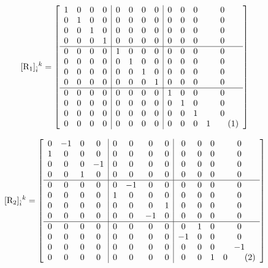 \documentclass[12pt]{article}
\newcommand\numberthis{\addtocounter{equation}{1}\tag{\theequation}}
\begin{document}
\[
[{\rm R_1}]_{\hat i}{}^{k} = \left[\begin{array}{cccc|cccc|cccc}
    1 & 0 & 0 & 0 & 0 & 0 & 0 & 0 & 0 & 0 & 0 & 0 \\ 
    0 & 1 & 0 & 0 & 0 & 0 & 0 & 0 & 0 & 0 & 0 & 0 \\ 
    0 & 0 & 1 & 0 & 0 & 0 & 0 & 0 & 0 & 0 & 0 & 0 \\ 
    0 & 0 & 0 & 1 & 0 & 0 & 0 & 0 & 0 & 0 & 0 & 0 \\ 
    \hline
    0 & 0 & 0 & 0 & 1 & 0 & 0 & 0 & 0 & 0 & 0 & 0 \\ 
    0 & 0 & 0 & 0 & 0 & 1 & 0 & 0 & 0 & 0 & 0 & 0 \\ 
    0 & 0 & 0 & 0 & 0 & 0 & 1 & 0 & 0 & 0 & 0 & 0 \\ 
    0 & 0 & 0 & 0 & 0 & 0 & 0 & 1 & 0 & 0 & 0 & 0 \\ 
    \hline
    0 & 0 & 0 & 0 & 0 & 0 & 0 & 0 & 1 & 0 & 0 & 0 \\ 
    0 & 0 & 0 & 0 & 0 & 0 & 0 & 0 & 0 & 1 & 0 & 0 \\ 
    0 & 0 & 0 & 0 & 0 & 0 & 0 & 0 & 0 & 0 & 1 & 0 \\ 
    0 & 0 & 0 & 0 & 0 & 0 & 0 & 0 & 0 & 0 & 0 & 1
\numberthis\end{array}\right] \]

\[
[{\rm R_2}]_{\hat i}{}^{k} = \left[\begin{array}{cccc|cccc|cccc}
    0 & -1 & 0 & 0 & 0 & 0 & 0 & 0 & 0 & 0 & 0 & 0 \\ 
    1 & 0 & 0 & 0 & 0 & 0 & 0 & 0 & 0 & 0 & 0 & 0 \\  
    0 & 0 & 0 & -1 & 0 & 0 & 0 & 0 & 0 & 0 & 0 & 0 \\ 
    0 & 0 & 1 & 0 & 0 & 0 & 0 & 0 & 0 & 0 & 0 & 0 \\  
    \hline
    0 & 0 & 0 & 0 & 0 & -1 & 0 & 0 & 0 & 0 & 0 & 0 \\ 
    0 & 0 & 0 & 0 & 1 & 0 & 0 & 0 & 0 & 0 & 0 & 0 \\  
    0 & 0 & 0 & 0 & 0 & 0 & 0 & 1 & 0 & 0 & 0 & 0 \\  
    0 & 0 & 0 & 0 & 0 & 0 & -1 & 0 & 0 & 0 & 0 & 0 \\ 
    \hline
    0 & 0 & 0 & 0 & 0 & 0 & 0 & 0 & 0 & 1 & 0 & 0 \\  
    0 & 0 & 0 & 0 & 0 & 0 & 0 & 0 & -1 & 0 & 0 & 0 \\ 
    0 & 0 & 0 & 0 & 0 & 0 & 0 & 0 & 0 & 0 & 0 & -1 \\ 
    0 & 0 & 0 & 0 & 0 & 0 & 0 & 0 & 0 & 0 & 1 & 0
\numberthis\end{array}\right] \]
\end{document}
